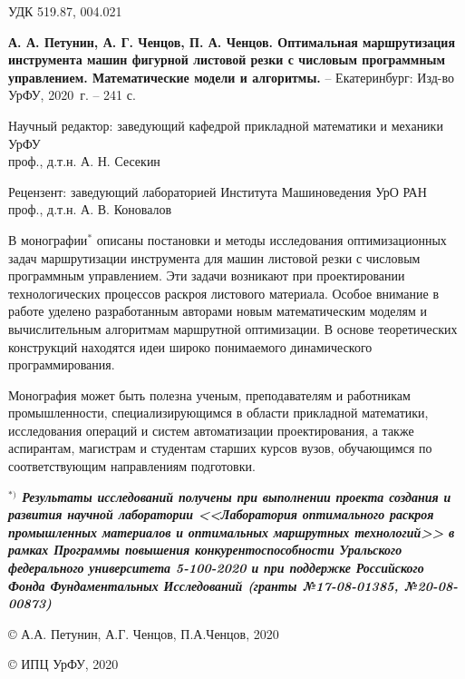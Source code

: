 
\thispagestyle{empty}
{
\setlength{\parindent}{0pt}
\setlength{\parskip}{1em}
\footnotesize

\noindent
УДК 519.87, 004.021

\vspace{3em}

{\bf
А. А. Петунин,
А. Г. Ченцов,
П. А. Ченцов.
Оптимальная маршрутизация инструмента машин фигурной листовой резки
с числовым программным управлением.
Математические модели и алгоритмы.
}
--
Екатеринбург:
Изд-во УрФУ,
2020~г.
--
241 с.

\vspace{3em}

\begin{center}

Научный редактор:
заведующий кафедрой прикладной математики и механики УрФУ
\\
проф., д.т.н. А. Н. Сесекин

Рецензент:
заведующий лабораторией Института Машиноведения УрО РАН
\\
проф., д.т.н. А. В. Коновалов
\end{center}

\vspace{3em}

В монографии$^*$
описаны постановки и методы исследования оптимизационных задач
маршрутизации инструмента для машин листовой резки
с числовым программным управлением.
Эти задачи возникают при проектировании технологических процессов
раскроя листового материала.
Особое внимание в работе уделено разработанным авторами
новым математическим моделям и вычислительным алгоритмам маршрутной оптимизации.
В основе теоретических конструкций находятся идеи
широко понимаемого динамического программирования.

Монография может быть полезна ученым, преподавателям и работникам промышленности,
специализирующимся в области прикладной математики,
исследования операций и систем автоматизации проектирования,
а также аспирантам, магистрам и студентам старших курсов вузов,
обучающимся по соответствующим направлениям подготовки.

{\bf \it
$^{*)}$
Результаты исследований получены при выполнении
проекта создания и развития научной лаборатории
<<Лаборатория оптимального раскроя промышленных материалов
и оптимальных маршрутных технологий>>
в рамках Программы повышения конкурентоспособности
Уральского федерального университета
5-100-2020
и при поддержке Российского Фонда Фундаментальных Исследований
(гранты №17-08-01385, №20-08-00873)
}

\vspace{3em}
{
\setlength{\parindent}{0.5\linewidth}
\setlength{\parskip}{0em}
\scriptsize

© А.А. Петунин, А.Г. Ченцов, П.А.Ченцов, 2020

© ИПЦ УрФУ, 2020
}}
